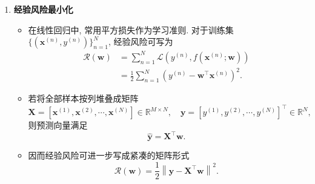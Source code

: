 \documentclass{../nndlcourse}
\begin{document}
\begin{enumerate}
    \item \textbf{经验风险最小化}
    \begin{itemize}
    \item 在线性回归中, 常用平方损失作为学习准则. 对于训练集 $\{(\boldsymbol{x}^{(n)}, y^{(n)})\}_{n=1}^N$, 经验风险可写为
        \begin{align*}
    \mathcal{R}(\boldsymbol{w}) & = \sum_{n=1}^N \mathcal{L}\left(y^{(n)}, f\left(\boldsymbol{x}^{(n)}; \boldsymbol{w}\right)\right) \\
    & = \frac{1}{2} \sum_{n=1}^N \left(y^{(n)} - \boldsymbol{w}^{\top} \boldsymbol{x}^{(n)}\right)^2.
        \end{align*}

    \item 若将全部样本按列堆叠成矩阵
    \begin{equation*}
      \boldsymbol{X} = \left[\boldsymbol{x}^{(1)}, \boldsymbol{x}^{(2)}, \cdots, \boldsymbol{x}^{(N)}\right] \in \mathbb{R}^{M \times N},
      \quad
      \boldsymbol{y} = \left[y^{(1)}, y^{(2)}, \cdots, y^{(N)}\right]^{\top} \in \mathbb{R}^{N},
    \end{equation*}
    则预测向量满足
    \begin{equation*}
      \hat{\boldsymbol{y}} = \boldsymbol{X}^{\top} \boldsymbol{w}.
    \end{equation*}

    \item 因而经验风险可进一步写成紧凑的矩阵形式
    \begin{equation*}
    \mathcal{R}(\boldsymbol{w}) = \frac{1}{2} \left\| \boldsymbol{y} - \boldsymbol{X}^{\top} \boldsymbol{w} \right\|^2.
    \end{equation*}


\end{itemize}
\end{enumerate}
\end{document}
